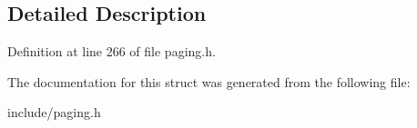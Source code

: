 \subsection{Detailed Description}


Definition at line 266 of file paging.\-h.



The documentation for this struct was generated from the following file\-:\begin{DoxyCompactItemize}
\item 
include/paging.\-h\end{DoxyCompactItemize}
